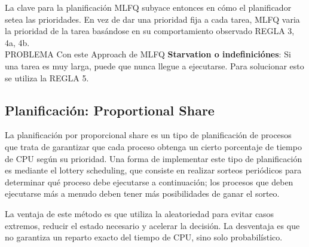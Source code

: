 \documentclass[../main.tex]{subfiles}
\begin{document}
        La clave para la planificación MLFQ subyace entonces en cómo el planificador setea las prioridades. En vez de dar una prioridad fija a cada tarea, MLFQ varia la prioridad de la tarea basándose en su comportamiento observado REGLA 3, 4a, 4b.\\

        PROBLEMA Con este Approach de MLFQ \textbf{Starvation o indefiniciónes}: Si una tarea es muy larga, puede que nunca llegue a ejecutarse. Para solucionar esto se utiliza la REGLA 5.

    \subsection*{Planificación: Proportional Share}
        La planificación por proporcional share es un tipo de planificación de procesos que trata de garantizar que cada proceso obtenga un cierto porcentaje de tiempo de CPU según su prioridad. Una forma de implementar este tipo de planificación es mediante el lottery scheduling, que consiste en realizar sorteos periódicos para determinar qué proceso debe ejecutarse a continuación; los procesos que deben ejecutarse más a menudo deben tener más posibilidades de ganar el sorteo.

        La ventaja de este método es que utiliza la aleatoriedad para evitar casos extremos, reducir el estado necesario y acelerar la decisión. La desventaja es que no garantiza un reparto exacto del tiempo de CPU, sino solo probabilístico.
\end{document}
